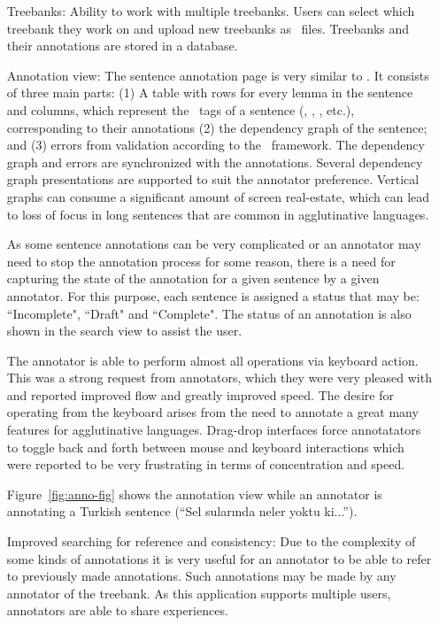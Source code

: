 \begin{itemize}[before=\normalfont, font=\itshape, align=left]
    \item[Treebanks:]
        Ability to work with multiple treebanks. Users can select which treebank they work on and upload new treebanks as \conllu\ files.
        Treebanks and their annotations are stored in a database.

    \item[Annotation view:]
        The sentence annotation page is very similar to \boatvone.
        It consists of three main parts: (1) A table with rows for every lemma in the sentence and columns, which represent the \ud\ tags of a sentence (\form, \lemma, \deprel, etc.), corresponding to their annotations (2) the dependency graph of the sentence; and (3) errors from validation according to the \ud\ framework.
        The dependency graph and errors are synchronized with the annotations.
        Several dependency graph presentations are supported to suit the annotator preference.
        Vertical graphs can consume a significant amount of screen real-estate, which can lead to loss of focus in long sentences that are common in agglutinative languages.

        As some sentence annotations can be very complicated or an annotator may need to stop the annotation process for some reason, there is a need for capturing the state of the annotation for a given sentence by a given annotator.
        For this purpose, each sentence is assigned a status that may be: ``Incomplete", ``Draft" and ``Complete".
        The status of an annotation is also shown in the search view to assist the user.

        The annotator is able to perform almost all operations via keyboard action.
        This was a strong request from annotators, which they were very pleased with and reported improved flow and greatly improved speed.
        The desire for operating from the keyboard arises from the need to annotate a great many features for agglutinative languages.
        Drag-drop interfaces force annotatators to toggle back and forth between mouse and keyboard interactions which were reported to be very frustrating in terms of concentration and speed.

        Figure~\ref{fig:anno-fig} shows the annotation view while an annotator is annotating a Turkish sentence (``Sel sularında neler yoktu ki...'').

    \item[Improved searching for reference and consistency:]
        Due to the complexity of some kinds of annotations it is very useful for an annotator to be able to refer to previously made annotations.
        Such annotations may be made by any annotator of the treebank.
        As this application supports multiple users, annotators are able to share experiences.


\end{itemize}
